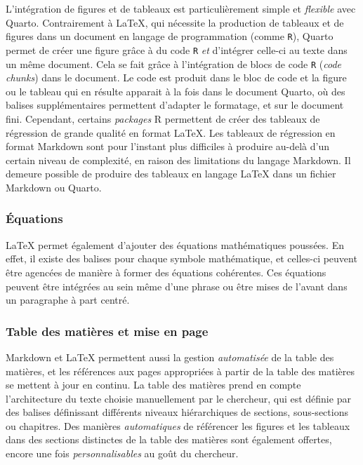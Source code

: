 \documentclass[
  letterpaper,
  DIV=11,
  numbers=noendperiod]{scrreprt}
\begin{document}
L'intégration de figures et de tableaux est particulièrement simple et
\emph{flexible} avec Quarto. Contrairement à LaTeX, qui nécessite la
production de tableaux et de figures dans un document en langage de
programmation (comme \texttt{R}), Quarto permet de créer une figure
grâce à du code \texttt{R} \emph{et} d'intégrer celle-ci au texte dans
un même document. Cela se fait grâce à l'intégration de blocs de code
\texttt{R} (\emph{code chunks}) dans le document. Le code est produit
dans le bloc de code et la figure ou le tableau qui en résulte apparait
à la fois dans le document Quarto, où des balises supplémentaires
permettent d'adapter le formatage, et sur le document fini. Cependant,
certains \emph{packages} R permettent de créer des tableaux de
régression de grande qualité en format LaTeX. Les tableaux de régression
en format Markdown sont pour l'instant plus difficiles à produire
au-delà d'un certain niveau de complexité, en raison des limitations du
langage Markdown. Il demeure possible de produire des tableaux en
langage LaTeX dans un fichier Markdown ou Quarto.

\subsubsection{Équations}\label{uxe9quations}

LaTeX permet également d'ajouter des équations mathématiques poussées.
En effet, il existe des balises pour chaque symbole mathématique, et
celles-ci peuvent être agencées de manière à former des équations
cohérentes. Ces équations peuvent être intégrées au sein même d'une
phrase ou être mises de l'avant dans un paragraphe à part centré.

\subsubsection{Table des matières et mise en
page}\label{table-des-matiuxe8res-et-mise-en-page}

Markdown et LaTeX permettent aussi la gestion \emph{automatisée} de la
table des matières, et les références aux pages appropriées à partir de
la table des matières se mettent à jour en continu. La table des
matières prend en compte l'architecture du texte choisie manuellement
par le chercheur, qui est définie par des balises définissant différents
niveaux hiérarchiques de sections, sous-sections ou chapitres. Des
manières \emph{automatiques} de référencer les figures et les tableaux
dans des sections distinctes de la table des matières sont également
offertes, encore une fois \emph{personnalisables} au goût du chercheur.
\end{document}
